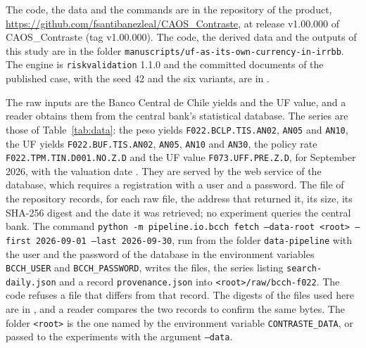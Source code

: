 The code, the data and the commands are in the repository of the product, \url{https://github.com/fsantibanezleal/CAOS_Contraste}, at release v1.00.000 of CAOS\_Contraste (tag v1.00.000). %
The code, the derived data and the outputs of this study are in the folder \texttt{manuscripts/}\allowbreak\texttt{uf-as-its-own-currency-in-irrbb}. The engine is \texttt{riskvalidation} 1.1.0 and the committed documents of the published case, with the seed 42 and the six variants, are in .

The raw inputs are the Banco Central de Chile yields and the UF value, and a reader obtains them from the central bank's statistical database. The series are those of Table~\ref{tab:data}: the peso yields \texttt{F022.BCLP.TIS.AN02}, \texttt{AN05} and \texttt{AN10}, the UF yields \texttt{F022.BUF.TIS.AN02}, \texttt{AN05}, \texttt{AN10} and \texttt{AN30}, the policy rate \texttt{F022.TPM.TIN.D001.NO.Z.D} and the UF value \texttt{F073.UFF.PRE.Z.D}, for September 2026, with the valuation date \valDate{}. They are served by the web service of the database, which requires a registration with a user and a password. The file  of the repository records, for each raw file, the address that returned it, its size, its SHA-256 digest and the date it was retrieved; no experiment queries the central bank. The command \texttt{python -m pipeline.io.bcch fetch --data-root <root> --first 2026-09-01 --last 2026-09-30}, run from the folder \texttt{data-pipeline} with the user and the password of the database in the environment variables \texttt{BCCH\_USER} and \texttt{BCCH\_PASSWORD}, writes the files, the series listing \texttt{search-daily.json} and a record \texttt{provenance.json} into \texttt{<root>/raw/bcch-f022}. The code refuses a file that differs from that record. The digests of the files used here are in , and a reader compares the two records to confirm the same bytes. The folder \texttt{<root>} is the one named by the environment variable \texttt{CONTRASTE\_DATA}, or passed to the experiments with the argument \texttt{--data}.

